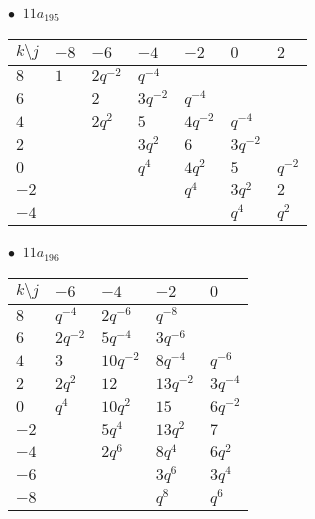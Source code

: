 \begin{minipage}{\linewidth}
$\bullet\ $ $11a_{195}$ \vspace{0.5em} \\
\begin{tabular}{l|llllll}
$k \setminus j$ & $-8$ & $-6$ & $-4$ & $-2$ & $0$ & $2$ \\
\hline
$8$ & $1$ & $2q^{-2}$ & $q^{-4}$ &  &  &  \\
$6$ &  & $2$ & $3q^{-2}$ & $q^{-4}$ &  &  \\
$4$ &  & $2q^{2}$ & $5$ & $4q^{-2}$ & $q^{-4}$ &  \\
$2$ &  &  & $3q^{2}$ & $6$ & $3q^{-2}$ &  \\
$0$ &  &  & $q^{4}$ & $4q^{2}$ & $5$ & $q^{-2}$ \\
$-2$ &  &  &  & $q^{4}$ & $3q^{2}$ & $2$ \\
$-4$ &  &  &  &  & $q^{4}$ & $q^{2}$ \\
\end{tabular}
\vspace{2em}
\end{minipage}
%
\begin{minipage}{\linewidth}
$\bullet\ $ $11a_{196}$ \vspace{0.5em} \\
\begin{tabular}{l|llll}
$k \setminus j$ & $-6$ & $-4$ & $-2$ & $0$ \\
\hline
$8$ & $q^{-4}$ & $2q^{-6}$ & $q^{-8}$ &  \\
$6$ & $2q^{-2}$ & $5q^{-4}$ & $3q^{-6}$ &  \\
$4$ & $3$ & $10q^{-2}$ & $8q^{-4}$ & $q^{-6}$ \\
$2$ & $2q^{2}$ & $12$ & $13q^{-2}$ & $3q^{-4}$ \\
$0$ & $q^{4}$ & $10q^{2}$ & $15$ & $6q^{-2}$ \\
$-2$ &  & $5q^{4}$ & $13q^{2}$ & $7$ \\
$-4$ &  & $2q^{6}$ & $8q^{4}$ & $6q^{2}$ \\
$-6$ &  &  & $3q^{6}$ & $3q^{4}$ \\
$-8$ &  &  & $q^{8}$ & $q^{6}$ \\
\end{tabular}
\vspace{2em}
\end{minipage}
%
